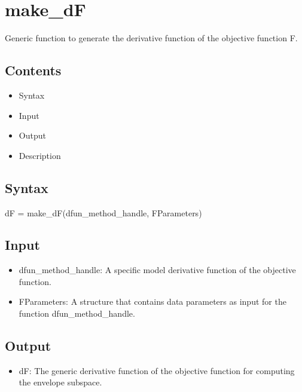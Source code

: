 \documentclass[a4paper,11pt,openany]{memoir}
\begin{document}
\newpage

\rmfamily
\color{black}\section{make\_dF}

\begin{par}
Generic function to generate the derivative function of the objective function F.
\end{par} \vspace{1em}

\subsection*{Contents}

\begin{itemize}
\setlength{\itemsep}{-1ex}
   \item Syntax
   \item Input
   \item Output
   \item Description
\end{itemize}


\subsection*{Syntax}

\begin{par}
dF = make\_dF(dfun\_method\_handle, FParameters)
\end{par} \vspace{1em}


\subsection*{Input}

\begin{itemize}
\setlength{\itemsep}{-1ex}
   \item dfun\_method\_handle: A specific model derivative function of the objective function.
   \item FParameters: A structure that contains data parameters as input for the function dfun\_method\_handle.
\end{itemize}


\subsection*{Output}

\begin{itemize}
\setlength{\itemsep}{-1ex}
   \item dF: The generic derivative function of the objective function for computing the envelope subspace.
\end{itemize}
\end{document}
